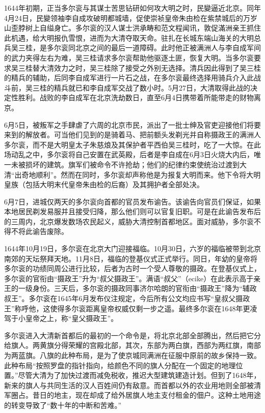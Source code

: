 1644年初期，正当多尔衮与其谋士苦思钻研如何攻大明之时，民變逼近北京。同年4月24日，民變领袖李自成攻破明都城墙，促使崇祯皇帝朱由检在紫禁城后的万岁山歪脖树上自缢身亡。多尔衮的汉人谋士洪承畴和范文程闻讯，敦促滿洲亲王抓住此机遇，给大明报仇雪恨，进而为大清夺取天命。驻扎在长城东端山海关的大明总兵吴三桂，是多尔衮同北京之间的最后一道障碍。此时他正被满洲人与李自成军间的武力夹得左右为难，吴三桂请求多尔衮帮助他驱逐土匪，恢复大明。当多尔衮要求吴三桂替大清效力之时，吴三桂除了接受之外别无选择。清兵因此得到了吴三桂的精兵的辅助，后同李自成军进行一片石之战，在多尔衮最终选择用骑兵介入此战斗前，吴三桂的精兵就已和李自成军交战了数小时。5月27日，大清取得此战的决定性胜利。战败的李自成军在北京洗劫数日，直至6月4日携带着所能带走的财物离京。

6月5日，被叛军之手肆虐了六周的北京市民，派出了一批士绅及官吏迎接他们将要来到的解放者。可当他们见到的是骑着马、把前额头发剃光并自称摄政王的满洲人多尔衮，而不是大明皇太子朱慈烺及其保护者平西伯吴三桂时，吃了一大惊。在此场动乱之中，多尔衮将自己安置在武英殿，后者是李自成在6月3日火烧大内后，唯一未被损坏的建筑。旗军们被命令不许抢劫；他们的纪律约束使统治过渡到大清“出奇地顺利”。然而在同时，多尔衮却声称他是为报复大明而来。他下令将大明皇族（包括大明末代皇帝朱由检的后裔）及其拥护者全部处决。

6月7日，进城仅两天的多尔衮向首都的官员发布谕告。该谕告向官员们保证，如果本地居民剃发易服并且接受归降，那么他们则可以官复旧职。可是在此谕告发布后的三周内，北京爆发数场农民起义，威胁大清控制首都地区。面对威胁，多尔衮不得不将此谕告废除。

1644年10月19日，多尔衮在北京大门迎接福临。10月30日，六岁的福临被带到北京南郊的天坛祭拜天地。11月8日，福临的登基仪式正式举行。同日，年幼的皇帝将多尔衮的功绩同周公进行比较，后者为古时一个受人尊敬的摄政。在登基仪式上，多尔衮的官衔由“摄政王”升为“叔父摄政王”。满语“叔父”（ecike）在此表示高于亲王的一级身份。三天后，多尔衮的摄政同事济尔哈朗的官衔由“摄政王”降为“辅政叔王”。多尔衮在1645年6月发布仪注规定，今后所有公文均应书写“皇叔父摄政王”称呼他，这使得多尔衮距离皇帝权威仅剩一步之遥。最终多尔衮在1648年更凌驾于小皇帝之上，称“皇父摄政王”。

多尔衮进入大清新首都后的最初的一个命令是，将北京北部全部腾出，然后把它分给旗人。两黄旗分得荣耀的宫殿北部，其次，东部为两白旗，西部为两红旗，南部为两蓝旗。八旗的此种布局，是为了使京城同满洲在征服中原前的故乡保持一致。此种布局“按照罗盘的指针指向，给颜色不同的旗人分配在一个固定的地理位置。”尽管大清为了加快过渡而减免税收，推迟大型建筑建造计划。但到了1648年，新来的旗人与共同生活的汉人百姓间仍有敌意。而首都以外的农业用地则全部被清军圈占。昔日的地主，现在却成了给外居旗人地主支付租金的佃户。这种土地用途的转变导致了“数十年的中断和苦难。”


